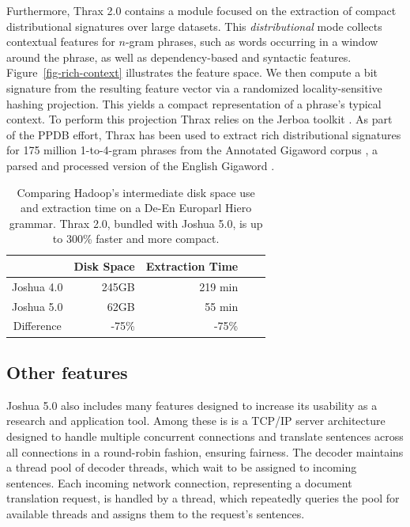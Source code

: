 \documentclass[11pt]{article}
\begin{document}
Furthermore, Thrax 2.0 contains a module focused on the extraction of
compact distributional signatures over large datasets. This
\emph{distributional} mode collects contextual features for $n$-gram
phrases, such as words occurring in a window around the phrase, as
well as dependency-based and syntactic
features. Figure~\ref{fig-rich-context} illustrates the feature
space. We then compute a bit signature from the resulting feature
vector via a randomized locality-sensitive hashing projection.  This
yields a compact representation of a phrase's typical context. To
perform this projection Thrax relies on the Jerboa toolkit
\cite{Jerboa}. As part of the PPDB effort, Thrax has been used to
extract rich distributional signatures for 175 million 1-to-4-gram
phrases from the Annotated Gigaword corpus \cite{annotated-gigaword},
a parsed and processed version of the English Gigaword
\cite{Gigaword}.

\begin{table}[t]
  \begin{center}
    \begin{tabular}{|c|r|r|r|r|}
      \hline
    & Disk Space & Extraction Time \\
      \hline
      \hline
      Joshua 4.0 & 245GB & 219 min \\
      \hline
      Joshua 5.0 & 62GB  & 55 min\\
      \hline
      \hline
      Difference & -75\% & -75\% \\
      \hline
    \end{tabular}
  \end{center}
  \caption{Comparing Hadoop's intermediate disk space use and extraction time on a
    De-En Europarl Hiero grammar. Thrax 2.0, bundled with Joshua 5.0,
    is up to 300\% faster and more compact.}
  \label{tab-thrax-speed}
\end{table}

\subsection{Other features}

Joshua 5.0 also includes many features designed to increase its
usability as a research and application tool. Among these is is a
TCP/IP server architecture designed to handle multiple concurrent
connections and translate sentences across all connections in a
round-robin fashion, ensuring fairness.  The decoder maintains a
thread pool of decoder threads, which wait to be assigned to incoming
sentences. Each incoming network connection, representing a document
translation request, is handled by a thread, which repeatedly queries
the pool for available threads and assigns them to the request's
sentences.
\end{document}
